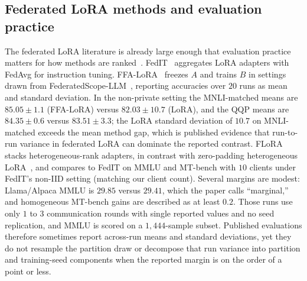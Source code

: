 \subsection{Federated LoRA methods and evaluation practice}
The federated LoRA literature is already large enough that evaluation practice matters for how methods are ranked~\cite{yang2025federatedlora}.
FedIT~\cite{zhang2024fedit} aggregates LoRA adapters with FedAvg for instruction tuning.
FFA-LoRA~\cite{sun2024ffalora} freezes $A$ and trains $B$ in settings drawn from FederatedScope-LLM~\cite{kuang2023federatedscope}, reporting accuracies over $20$ runs as mean and standard deviation. In the non-private setting the MNLI-matched means are $85.05{\pm}1.1$ (FFA-LoRA) versus $82.03{\pm}10.7$ (LoRA), and the QQP means are $84.35{\pm}0.6$ versus $83.51{\pm}3.3$; the LoRA standard deviation of $10.7$ on MNLI-matched exceeds the mean method gap, which is published evidence that run-to-run variance in federated LoRA can dominate the reported contrast.
FLoRA~\cite{wang2024flora} stacks heterogeneous-rank adapters, in contrast with zero-padding heterogeneous LoRA~\cite{cho2024hetlora}, and compares to FedIT on MMLU and MT-bench with $10$ clients under FedIT's non-IID setting (matching our client count). Several margins are modest: Llama/Alpaca MMLU is $29.85$ versus $29.41$, which the paper calls ``marginal,'' and homogeneous MT-bench gains are described as at least $0.2$. Those runs use only $1$ to $3$ communication rounds with single reported values and no seed replication, and MMLU is scored on a $1{,}444$-sample subset. Published evaluations therefore sometimes report across-run means and standard deviations, yet they do not resample the partition draw or decompose that run variance into partition and training-seed components when the reported margin is on the order of a point or less.

